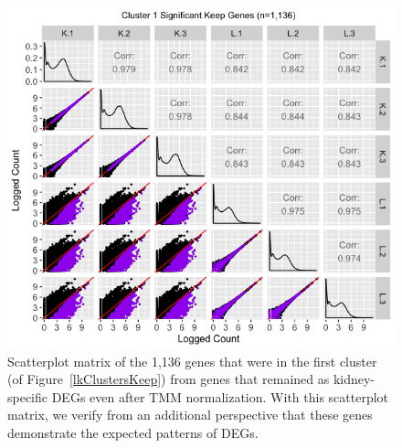 \documentclass[11pt,a4paper,oldfontcommands,openany]{memoir}
\numberwithin{equation}{section} %
\begin{document}
\null
\begin{figure}[t!]
\begin{framed}
\centerline{\includegraphics[width=1\columnwidth]{MakeFigures/lkClustersKeepSM.jpg}}
\end{framed}
\caption{Scatterplot matrix of the 1,136 genes that were in the first cluster (of Figure~\ref{lkClustersKeep}) from genes that remained as kidney-specific DEGs even after TMM normalization. With this scatterplot matrix, we verify from an additional perspective that these genes demonstrate the expected patterns of DEGs.
\label{lkClustersKeepSM}}
\end{figure}
\end{document}
